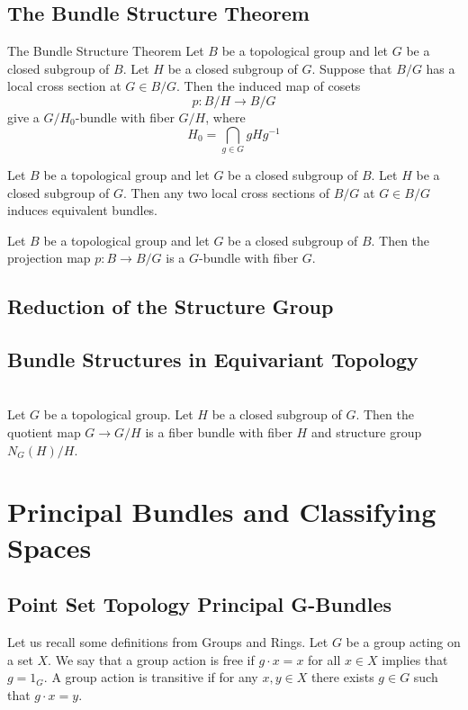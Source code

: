 \documentclass[a4paper]{article}
\begin{document}
\subsection{The Bundle Structure Theorem}
\begin{thm}{The Bundle Structure Theorem}{} Let $B$ be a topological group and let $G$ be a closed subgroup of $B$. Let $H$ be a closed subgroup of $G$. Suppose that $B/G$ has a local cross section at $G\in B/G$. Then the induced map of cosets $$p:B/H\to B/G$$ give a $G/H_0$-bundle with fiber $G/H$, where $$H_0=\bigcap_{g\in G}gHg^{-1}$$
\end{thm}

\begin{thm}{}{} Let $B$ be a topological group and let $G$ be a closed subgroup of $B$. Let $H$ be a closed subgroup of $G$. Then any two local cross sections of $B/G$ at $G\in B/G$ induces equivalent bundles. 
\end{thm}

\begin{crl}{}{} Let $B$ be a topological group and let $G$ be a closed subgroup of $B$. Then the projection map $p:B\to B/G$ is a $G$-bundle with fiber $G$. 
\end{crl}

\subsection{Reduction of the Structure Group}

\subsection{Bundle Structures in Equivariant Topology}
\begin{prp}{}{}\\
Let $G$ be a topological group. Let $H$ be a closed subgroup of $G$. Then the quotient map $G\to G/H$ is a fiber bundle with fiber $H$ and structure group $N_G(H)/H$. 
\end{prp}

\pagebreak
\section{Principal Bundles and Classifying Spaces}
\subsection{Point Set Topology Principal G-Bundles}
Let us recall some definitions from Groups and Rings. Let $G$ be a group acting on a set $X$. We say that a group action is free if $g\cdot x=x$ for all $x\in X$ implies that $g=1_G$. A group action is transitive if for any $x,y\in X$ there exists $g\in G$ such that $g\cdot x=y$. 
\end{document}
